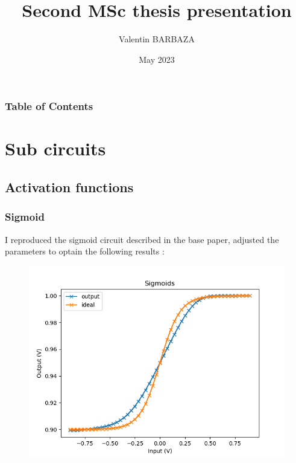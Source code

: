 \documentclass{beamer}
\title[MSc Thesis 2]
{Second MSc thesis presentation}
\author[V. BARBAZA]{Valentin BARBAZA}
\date[2023] %
{May 2023}
\begin{document}
\frame{\titlepage}

\begin{frame}
  \frametitle{Table of Contents}
  \tableofcontents
\end{frame}

\section{Sub circuits}
\subsection{Activation functions}

\begin{frame}
  \frametitle{Sigmoid}
  I reproduced the sigmoid circuit described in the base paper, adjusted the parameters to optain the following results :
  \begin{figure}
    \centering
    \includegraphics[height=0.5\textheight]{figures/sigmoid.png}
  \end{figure}
\end{frame}
\end{document}
